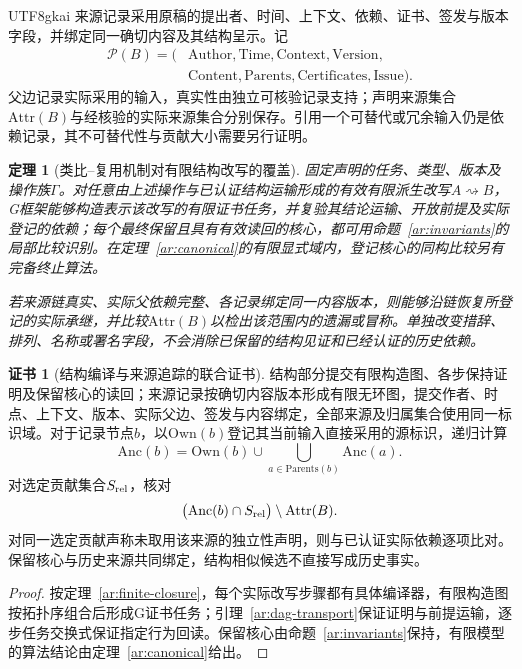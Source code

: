 \documentclass[11pt,a4paper]{article}
\theoremstyle{plain}
\newtheorem{theorem}{定理}[section]
\theoremstyle{definition}
\newtheorem*{certificate}{证书}
\theoremstyle{remark}
\begin{document}
\begin{CJK*}{UTF8}{gkai}
来源记录采用原稿的提出者、时间、上下文、依赖、证书、签发与版本字段，并绑定同一确切内容及其结构呈示\cite{S20,S38}。记
\[
 \begin{aligned}
 \mathcal P(B)=\bigl(&\mathrm{Author},\mathrm{Time},\mathrm{Context},
                    \mathrm{Version},\\
                   &\mathrm{Content},\mathrm{Parents},
                    \mathrm{Certificates},\mathrm{Issue}\bigr).
 \end{aligned}
\]
父边记录实际采用的输入，真实性由独立可核验记录支持；声明来源集合$\mathrm{Attr}(B)$与经核验的实际来源集合分别保存。引用一个可替代或冗余输入仍是依赖记录，其不可替代性与贡献大小需要另行证明。

\begin{theorem}[类比--复用机制对有限结构改写的覆盖]
\label{ar:main}
固定声明的任务、类型、版本及操作族$\Gamma$。对任意由上述操作与已认证结构运输形成的有效有限派生改写$A\rightsquigarrow B$，G框架能够构造表示该改写的有限证书任务，并复验其结论运输、开放前提及实际登记的依赖；每个最终保留且具有有效读回的核心，都可用命题~\ref{ar:invariants}的局部比较识别。在定理~\ref{ar:canonical}的有限显式域内，登记核心的同构比较另有完备终止算法。

若来源链真实、实际父依赖完整、各记录绑定同一内容版本，则能够沿链恢复所登记的实际承继，并比较$\mathrm{Attr}(B)$以检出该范围内的遗漏或冒称。单独改变措辞、排列、名称或署名字段，不会消除已保留的结构见证和已经认证的历史依赖。
\end{theorem}
\begin{certificate}[结构编译与来源追踪的联合证书]
结构部分提交有限构造图、各步保持证明及保留核心的读回；来源记录按确切内容版本形成有限无环图，提交作者、时点、上下文、版本、实际父边、签发与内容绑定，全部来源及归属集合使用同一标识域。对于记录节点$b$，以$\mathrm{Own}(b)$登记其当前输入直接采用的源标识，递归计算
\[
 \mathrm{Anc}(b)=\mathrm{Own}(b)\cup
       \bigcup_{a\in\mathrm{Parents}(b)}\mathrm{Anc}(a).
\]
对选定贡献集合$S_{\rm rel}$，核对
\[
 \bigl(\mathrm{Anc}(b)\cap S_{\rm rel}\bigr)
       \setminus\mathrm{Attr}(B).
\]
对同一选定贡献声称未取用该来源的独立性声明，则与已认证实际依赖逐项比对。保留核心与历史来源共同绑定，结构相似候选不直接写成历史事实。
\end{certificate}
\begin{proof}
按定理~\ref{ar:finite-closure}，每个实际改写步骤都有具体编译器，有限构造图按拓扑序组合后形成G证书任务；引理~\ref{ar:dag-transport}保证证明与前提运输，逐步任务交换式保证指定行为回读。保留核心由命题~\ref{ar:invariants}保持，有限模型的算法结论由定理~\ref{ar:canonical}给出。


\end{proof}
\end{CJK*}
\end{document}
